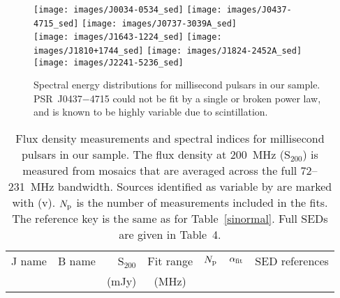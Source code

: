 \documentclass{pasa}%
\begin{document}
\begin{figure*}
\texttt{[image: images/J0034-0534\_sed]}\hspace*{-0.5em}%
\hspace*{-0.5em}\texttt{[image: images/J0437-4715\_sed]}\hspace*{-0.5em}%
\hspace*{-0.5em}\texttt{[image: images/J0737-3039A\_sed]} \\[-0.6em]
\texttt{[image: images/J1643-1224\_sed]}\hspace*{-0.5em}%
\hspace*{-0.5em}\texttt{[image: images/J1810+1744\_sed]}\hspace*{-0.5em}%
\hspace*{-0.5em}\texttt{[image: images/J1824-2452A\_sed]} \\[-0.6em]
\texttt{[image: images/J2241-5236\_sed]}\hspace*{-0.5em}%
\\
\caption{Spectral energy distributions for millisecond pulsars in our sample. PSR~J0437$-$4715 could not be fit by a single or broken power law, and is known to be highly variable due to scintillation.}
\label{seds2}
\end{figure*}

\begin{table*}
  \centering
  \caption{Flux density measurements and spectral indices for millisecond pulsars in our sample. The flux density at 200~MHz (S$_{200}$) is measured from mosaics that are averaged across the full 72--231~MHz bandwidth.
Sources identified as variable by \citet{bell16} are marked with (v). $N_{\rm p}$ is the number of measurements included in the fits.
The reference key is the same as for Table~\ref{sinormal}. Full SEDs are given in Table~4.}
  \label{similli}
  \begin{tabular}{llrccrr}
    \hline
    J name & B name & S$_{200}$  & Fit range & $N_{\rm p}$ & $\alpha_{\rm fit}$ & SED references \\
           &        & (mJy)        & (MHz)       & &     &   \\
    \hline

    \hline
  \end{tabular}
\end{table*}
\end{document}
